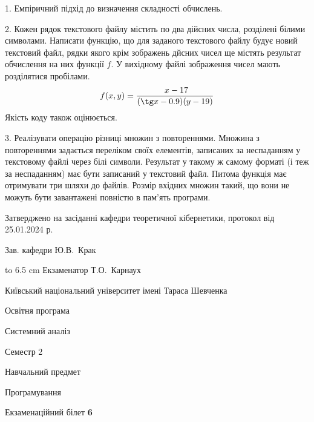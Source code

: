 \documentclass[12pt, ukrainian]{article}
\begin{document}
{%
1. Емпіричний підхід до визначення складності обчислень.%
\par
\vspace{2mm}

2. Кожен рядок текстового файлу містить по два дійсних числа, розділені білими символами.
Написати функцію, що для заданого текстового файлу будує новий текстовий файл, рядки якого крім зображень дйсних чисел ще містять результат обчислення на них функції $f$. У вихідному файлі зображення чисел мають розділятися пробілами. 
$$f(x, y) =\frac{\ x - 17}{(\tg x - 0.9) (y - 19)}$$ 
Якість коду також оцінюється.

\par
\vspace{2mm}

3. Реалізувати операцію різниці множин з повтореннями. Множина з повтореннями задається переліком своїх елементів, записаних за неспаданням у текстовому файлі через білі символи. Результат у такому ж самому форматі (і теж за неспаданням) має бути записаний у текстовий файл. Питома функція має отримувати три шляхи до файлів. Розмір вхідних множин такий, що вони не можуть бути завантажені повністю в пам’ять програми.

}
{\smallskip\smallskip \begin {scriptsize} Затверджено на засіданні кафедри теоретичної кібернетики, протокол   від   25.01.2024 р.\par\smallskip\smallskip\smallskip\smallskip
{\parbox {6.5 cm} {Зав. кафедри \dotfill Ю.В.~Крак}}\hspace {0.7cm} {\hbox to 6.5 cm { Екзаменатор \dotfill Т.О.~Карнаух}} \end{scriptsize}}
\vspace{0.9cm}
{{\begin {scriptsize}\par
{ \center  Київський національний університет імені Тараса Шевченка \par}
{\parbox {5 cm}{Освітня програма \hfill}{\parbox {7 cm}{Системний аналіз\hfill}}\parbox {6 cm}{\hfill Семестр 2}}\par
{\parbox {5 cm} {Навчальний предмет \hfill}\parbox {7 cm}{Програмування \hfill}\parbox {6cm}{\hfill}\par}\vspace{-15pt} \end{scriptsize}}{\center Екзаменаційний білет \No \textbf { 6 }\par}}
\end{document}
